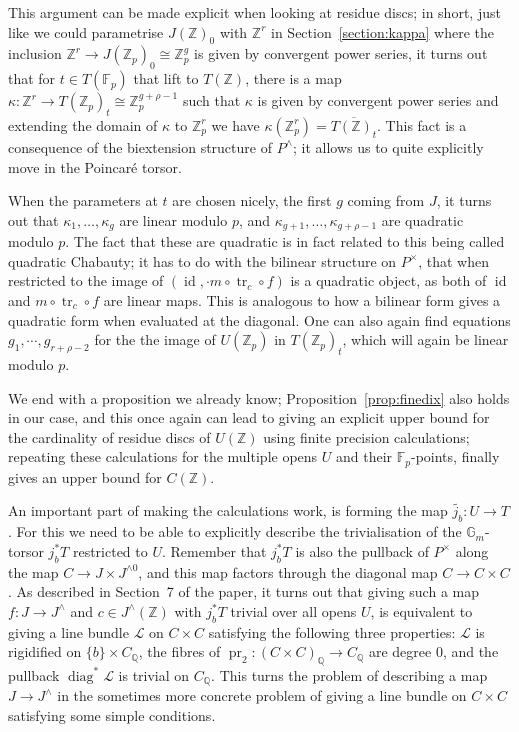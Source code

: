 \documentclass[12pt]{article}
\newcommand{\Z}{\mathbb{Z}}
\renewcommand{\G}{\mathbb{G}}
\newcommand{\Q}{\mathbb{Q}}
\newcommand{\Lcal}{\mathcal{L}}
\newcommand{\F}{\mathbb{F}}
\DeclareMathOperator{\id}{id}
\DeclareMathOperator{\tr}{tr}
\DeclareMathOperator{\pr}{pr}
\DeclareMathOperator{\diag}{diag}
\theoremstyle{plain}
\theoremstyle{definition}
\theoremstyle{remark}
\begin{document}
This argument can be made explicit when looking at residue discs; in short, just like we could parametrise $J(\Z)_0$ with $\Z^r$ in Section~\ref{section:kappa} where the inclusion $\Z^r \to J(\Z_p)_0 \cong \Z_p^{g}$ is given by convergent power series, it turns out that for $t \in T(\F_p)$ that lift to $T(\Z)$, there is a map $\kappa: \Z^r \to T(\Z_p)_t \cong \Z_p^{g+\rho-1}$ such that $\kappa$ is given by convergent power series and extending the domain of $\kappa$ to $\Z_p^r$ we have $\kappa(\Z_p^r) = \overline{T(\Z)_t}$. This fact is a consequence of the biextension structure of $P^\wedge$; it allows us to quite explicitly move in the Poincar\'e torsor.

When the parameters at $t$ are chosen nicely, the first $g$ coming from $J$, it turns out that $\kappa_1,\dots,\kappa_g$ are linear modulo $p$, and $\kappa_{g+1},\dots,\kappa_{g+\rho-1}$ are quadratic modulo $p$. The fact that these are quadratic is in fact related to this being called quadratic Chabauty; it has to do with the bilinear structure on $P^\times$, that when restricted to the image of $(\id,\cdot m \circ\tr_c \circ f)$ is a quadratic object, as both of $\id$ and $m \circ\tr_c \circ f$ are linear maps. This is analogous to how a bilinear form gives a quadratic form when evaluated at the diagonal. One can also again find equations $g_1,\cdots,g_{r+\rho-2}$ for the the image of $U(\Z_p)$ in $T(\Z_p)_t$, which will again be linear modulo $p$.

We end with a proposition we already know; Proposition~\ref{prop:finedix} also holds in our case, and this once again can lead to giving an explicit upper bound for the cardinality of residue discs of $U(\Z)$ using finite precision calculations; repeating these calculations for the multiple opens $U$ and their $\F_p$-points, finally gives an upper bound for $C(\Z)$.

An important part of making the calculations work, is forming the map $\widetilde{j_b}: U \to T$. For this we need to be able to explicitly describe the trivialisation of the $\G_m$-torsor $j_b^* T$ restricted to $U$. Remember that $j_b^* T$ is also the pullback of $P^\times$ along the map $C \to J \times J^{\wedge 0}$, and this map factors through the diagonal map $C \to C\times C$. As described in Section~7 of the paper, it turns out that giving such a map $f: J \to J^{\wedge}$ and $c \in J^\wedge(\Z)$ with $j_b^* T$ trivial over all opens $U$, is equivalent to giving a line bundle $\Lcal$ on $C \times C$ satisfying the following three properties: $\Lcal$ is rigidified on $\{b\} \times C_\Q$, the fibres of $\pr_2: (C \times C)_\Q \to C_\Q$ are degree $0$, and the pullback $\diag^* \Lcal$ is trivial on $C_\Q$. This turns the problem of describing a map $J \to J^\wedge$ in the sometimes more concrete problem of giving a line bundle on $C \times C$ satisfying some simple conditions.
\end{document}
